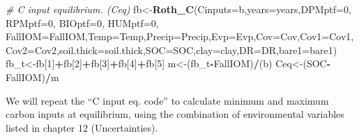 \documentclass[
  10pt,
  b5paper,
]{book}
\newenvironment{Shaded}{\begin{snugshade}}{\end{snugshade}}
\newcommand{\CommentTok}[1]{\textcolor[rgb]{0.56,0.35,0.01}{\textit{#1}}}
\newcommand{\DataTypeTok}[1]{\textcolor[rgb]{0.13,0.29,0.53}{#1}}
\newcommand{\DecValTok}[1]{\textcolor[rgb]{0.00,0.00,0.81}{#1}}
\newcommand{\KeywordTok}[1]{\textcolor[rgb]{0.13,0.29,0.53}{\textbf{#1}}}
\newcommand{\NormalTok}[1]{#1}
\newcommand{\OperatorTok}[1]{\textcolor[rgb]{0.81,0.36,0.00}{\textbf{#1}}}
\begin{document}
\begin{Shaded}
\begin{Highlighting}[]
\CommentTok{# C input equilibrium. (Ceq)}
\NormalTok{fb<-}\KeywordTok{Roth_C}\NormalTok{(}\DataTypeTok{Cinputs=}\NormalTok{b,}\DataTypeTok{years=}\NormalTok{years,}\DataTypeTok{DPMptf=}\DecValTok{0}\NormalTok{, }\DataTypeTok{RPMptf=}\DecValTok{0}\NormalTok{, }\DataTypeTok{BIOptf=}\DecValTok{0}\NormalTok{, }\DataTypeTok{HUMptf=}\DecValTok{0}\NormalTok{, }\DataTypeTok{FallIOM=}\NormalTok{FallIOM,}\DataTypeTok{Temp=}\NormalTok{Temp,}\DataTypeTok{Precip=}\NormalTok{Precip,}\DataTypeTok{Evp=}\NormalTok{Evp,}\DataTypeTok{Cov=}\NormalTok{Cov,}\DataTypeTok{Cov1=}\NormalTok{Cov1,}\DataTypeTok{Cov2=}\NormalTok{Cov2,}\DataTypeTok{soil.thick=}\NormalTok{soil.thick,}\DataTypeTok{SOC=}\NormalTok{SOC,}\DataTypeTok{clay=}\NormalTok{clay,}\DataTypeTok{DR=}\NormalTok{DR,}\DataTypeTok{bare1=}\NormalTok{bare1)}
\NormalTok{fb_t<-fb[}\DecValTok{1}\NormalTok{]}\OperatorTok{+}\NormalTok{fb[}\DecValTok{2}\NormalTok{]}\OperatorTok{+}\NormalTok{fb[}\DecValTok{3}\NormalTok{]}\OperatorTok{+}\NormalTok{fb[}\DecValTok{4}\NormalTok{]}\OperatorTok{+}\NormalTok{fb[}\DecValTok{5}\NormalTok{]}
\NormalTok{m<-(fb_t}\OperatorTok{-}\NormalTok{FallIOM)}\OperatorTok{/}\NormalTok{(b)}
\NormalTok{Ceq<-(SOC}\OperatorTok{-}\NormalTok{FallIOM)}\OperatorTok{/}\NormalTok{m}
\end{Highlighting}
\end{Shaded}

We will repeat the ``C input eq. code'' to calculate minimum and maximum carbon inputs at equilibrium, using the combination of environmental variables listed in chapter 12 (Uncertainties).
\end{document}
